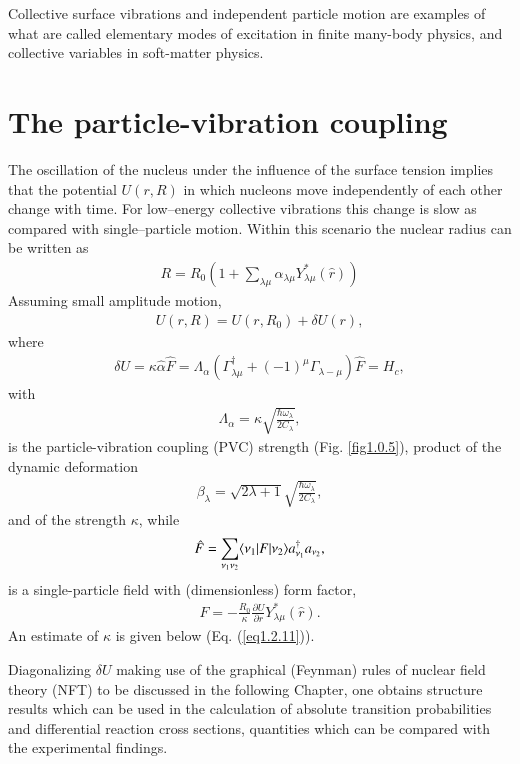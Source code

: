 Collective surface vibrations and independent particle motion are examples of what are called elementary modes of excitation in finite many-body physics, and collective variables in soft-matter physics.

\section{The particle-vibration coupling}\label{Sect1.2}
The oscillation of the nucleus under the influence of the surface tension implies that the potential $U(r,R)$ in which nucleons move independently of each other change with time. For low--energy collective vibrations this change is slow as compared with single--particle motion. Within this scenario the nuclear radius can be written as  
\begin{align}\label{eq1.0.12}
R=R_0\left(1+\sum_{\lambda\mu}\alpha_{\lambda\mu}Y_{\lambda\mu}^*(\hat r)\right)
\end{align}
Assuming small amplitude motion,
\begin{align}\label{eq1.0.13}
U(r,R)=U(r,R_0)+\delta U(r),
\end{align}
where
\begin{align}\label{eq1.0.14}
\delta U=\kappa\hat \alpha \hat F=\Lambda_\alpha\left(\Gamma_{\lambda\mu}^\dagger+(-1)^\mu\Gamma_{\lambda-\mu}\right)\hat F=H_c,
\end{align}
with
\begin{align}\label{eq1.2.4x}
\Lambda_\alpha=\kappa\sqrt{\frac{\hbar\omega_\lambda}{2C_\lambda}},
\end{align}
is the particle-vibration coupling (PVC) strength (Fig. \ref{fig1.0.5}), product of the dynamic deformation
\begin{align}\label{eq1.2.5x}
\beta_\lambda=\sqrt{2\lambda+1}\sqrt{\frac{\hbar\omega_\lambda}{2C_\lambda}},
\end{align}
and of the strength $\kappa$, while 
\begin{align}\label{eq1.0.15}
\hat F=\sum_{\nu_1\nu_2}\langle {\nu_1}|F|{\nu_2} \rangle a_{\nu_1}^\dagger a_{\nu_2},
\end{align}
is a single-particle field with  (dimensionless) form factor,
\begin{align}\label{eq1.0.16}
F=-\frac{R_0}{\kappa}\frac{\partial U}{\partial r}Y^*_{\lambda\mu}(\hat r).
\end{align}
An estimate of $\kappa$ is given below (Eq. (\ref{eq1.2.11})).


 Diagonalizing $\delta U$ making use of the graphical (Feynman) rules of nuclear field theory (NFT) to be discussed in the following Chapter, one obtains structure results which can be used in the calculation of absolute transition probabilities and differential reaction cross sections, quantities which can be compared with the experimental findings.

